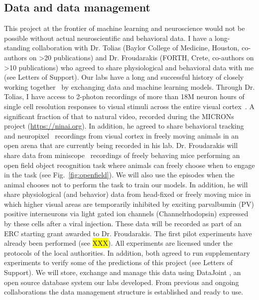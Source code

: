 \documentclass[B2,COG]{ercgrant}
\begin{document}
\subsection{Data and data management}
This project at the frontier of machine learning and neuroscience would not be possible without actual neuroscientific and behavioral data. 
I have a long-standing collaboration with Dr. Tolias (Baylor College of Medicine, Houston, co-authors on >20  publications) and Dr. Froudarakis (FORTH, Crete, co-authors on >10 publications) who agreed to share physiological and behavioral data with me (see Letters of Support).
Our labs have a long and successful history of closely working together~\parencite[\eg][]{Froudarakis2014-jv,Walker2019-yw,Lurz2020-ua,Bashiri2021-or,Franke2022-do} by exchanging data and machine learning models. 
Through Dr. Tolias, I have access to 2-photon recordings of more than 18M neuron hours of single cell resolution responses to visual stimuli across the entire visual cortex~\parencite{Sofroniew2016-xg}. A significant fraction of that to natural video, recorded during the MICRONs project (\url{https://ninai.org}).
In addition, he agreed to share behavioral tracking and neuropixel~\parencite{Steinmetz2021-jk} recordings from visual cortex in freely moving animals in an open arena that are currently being recorded in his lab.
Dr. Froudarakis will share data from miniscope~\parencite{Cai2016-rh}
recordings of freely behaving mice performing an open field object recognition task where animals can freely choose when to engage in the task (see Fig.~\ref{fig:openfield}). 
We will also use the episodes when the animal chooses not to perform the task to train our models. 
In addition, he will share physiological (and behavior) data from head-fixed or freely moving mice in which higher visual areas are temporarily inhibited by exciting parvalbumin (PV) positive interneurons via light gated ion channels (Channelrhodopsin) expressed by these cells after a viral injection.
These data will be recorded as part of an ERC starting grant awarded to Dr. Froudarakis. 
The first pilot experiments have already been performed (see \hl{XXX}).
All experiments are licensed under the protocols of the local authorities. 
In addition, both agreed to run supplementary experiments to verify some of the predictions of this project (see Letters of Support).
We will store, exchange and manage this data using DataJoint \parencite[\url{https://www.datajoint.org/},][]{Yatsenko2015-id}, an open source database system our labs developed. 
From previous and ongoing collaborations the data management structure is established and ready to use.
\end{document}

